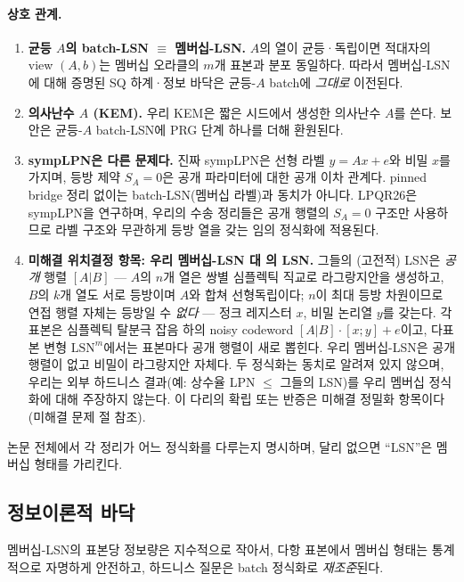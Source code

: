 \documentclass[11pt,a4paper]{article}
\theoremstyle{plain}
\theoremstyle{definition}
\begin{document}
\paragraph{상호 관계.}
\begin{enumerate}
\item \textbf{균등 $A$의 batch-LSN $\equiv$ 멤버십-LSN.} $A$의 열이 균등·독립이면 적대자의 view $(A,b)$는 멤버십 오라클의 $m$개 표본과 분포 동일하다. 따라서 멤버십-LSN에 대해 증명된 SQ 하계·정보 바닥은 균등-$A$ batch에 \emph{그대로} 이전된다.
\item \textbf{의사난수 $A$ (KEM).} 우리 KEM은 짧은 시드에서 생성한 의사난수 $A$를 쓴다. 보안은 균등-$A$ batch-LSN에 PRG 단계 하나를 더해 환원된다.
\item \textbf{sympLPN은 다른 문제다.} 진짜 sympLPN은 선형 라벨 $y = Ax+e$와 비밀 $x$를 가지며, 등방 제약 $S_A=0$은 공개 파라미터에 대한 공개 이차 관계다. pinned bridge 정리 없이는 batch-LSN(멤버십 라벨)과 동치가 아니다. LPQR26은 sympLPN을 연구하며, 우리의 수송 정리들은 공개 행렬의 $S_A=0$ 구조만 사용하므로 라벨 구조와 무관하게 등방 열을 갖는 임의 정식화에 적용된다.
\item \textbf{미해결 위치결정 항목: 우리 멤버십-LSN 대 \cite{KLP+25,LPQR26}의 LSN.} 그들의 (고전적) LSN은 \emph{공개} 행렬 $[A|B]$ --- $A$의 $n$개 열은 쌍별 심플렉틱 직교로 라그랑지안을 생성하고, $B$의 $k$개 열도 서로 등방이며 $A$와 합쳐 선형독립이다; $n$이 최대 등방 차원이므로 연접 행렬 자체는 등방일 수 \emph{없다} --- 정크 레지스터 $x$, 비밀 논리열 $y$를 갖는다. 각 표본은 심플렉틱 탈분극 잡음 하의 noisy codeword $[A|B]\cdot[x;y]+e$이고, 다표본 변형 $\mathrm{LSN}^m$에서는 표본마다 공개 행렬이 새로 뽑힌다. 우리 멤버십-LSN은 공개 행렬이 없고 비밀이 라그랑지안 자체다. 두 정식화는 동치로 알려져 있지 않으며, 우리는 외부 하드니스 결과(예: 상수율 LPN $\le$ 그들의 LSN)를 우리 멤버십 정식화에 대해 주장하지 않는다. 이 다리의 확립 또는 반증은 미해결 정밀화 항목이다(미해결 문제 절 참조).
\end{enumerate}

논문 전체에서 각 정리가 어느 정식화를 다루는지 명시하며, 달리 없으면 ``LSN''은 멤버십 형태를 가리킨다.

\subsection{정보이론적 바닥}

멤버십-LSN의 표본당 정보량은 지수적으로 작아서, 다항 표본에서 멤버십 형태는 통계적으로 자명하게 안전하고, 하드니스 질문은 batch 정식화로 \emph{재조준}된다.
\end{document}
